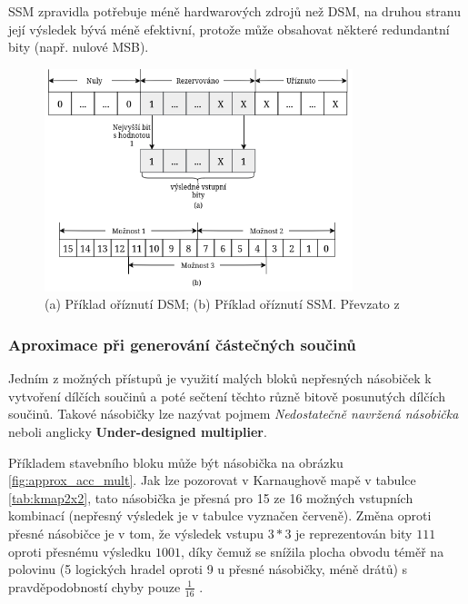 SSM zpravidla potřebuje méně hardwarových zdrojů než DSM, na druhou stranu její výsledek bývá méně efektivní, protože může obsahovat některé redundantní bity (např. nulové MSB).

\begin{figure}[H]
    \centering
    \includegraphics[width=0.8\textwidth]{obrazky-figures/dsm_ssm.png}
    \caption{(a) Příklad oříznutí DSM; (b) Příklad oříznutí SSM. Převzato z \cite{approx_mult_survey}}
    \label{fig:dsm_ssm}
\end{figure}

\subsubsection{Aproximace při generování částečných součinů}
Jedním z možných přístupů je využití malých bloků nepřesných násobiček k vytvoření dílčích součinů a poté sečtení těchto různě bitově posunutých dílčích součinů. Takové násobičky lze nazývat pojmem \textit{Nedostatečně navržená násobička} neboli anglicky \textbf{Under-designed multiplier}. 

Příkladem stavebního bloku může být násobička na obrázku \ref{fig:approx_acc_mult}. Jak lze pozorovat v Karnaughově mapě v tabulce \ref{tab:kmap2x2}, tato násobička je přesná pro 15 ze 16 možných vstupních kombinací (nepřesný výsledek je v tabulce vyznačen červeně). Změna oproti přesné násobičce je v tom, že výsledek vstupu $3*3$ je reprezentován bity $111$ oproti přesnému výsledku $1001$, díky čemuž se snížila plocha obvodu téměř na polovinu (5 logických hradel oproti 9 u přesné násobičky, méně drátů) s pravděpodobností chyby pouze $\frac{1}{16}$ \cite{underdesigned_mult}.

